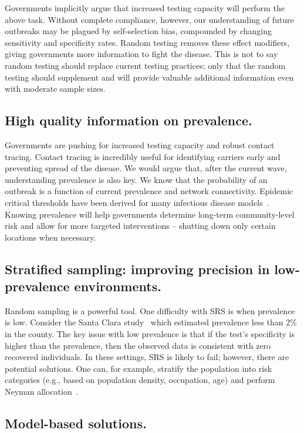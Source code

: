 \documentclass[11pt]{amsart}
\begin{document}
Governments implicitly argue that increased testing capacity will perform the above task.  Without complete compliance, however, our understanding of future outbreaks may be plagued by self-selection bias, compounded by changing sensitivity and specificity rates. Random testing removes these effect modifiers, giving governments more information to fight the disease.  This is not to say random testing should replace current testing practices; only that the random testing should supplement and will provide valuable additional information even with moderate sample sizes.

\subsection*{High quality information on prevalence.}

Governments are pushing for increased testing capacity and robust contact tracing.  Contact tracing is incredibly useful for identifying carriers early and preventing spread of the disease.  We would argue that, after the current wave, understanding prevalence is also key.  We know that the probability of an outbreak is a function of current prevalence and network connectivity.  Epidemic critical thresholds have been derived for many infectious disease models~\citep{Pastor2001,Newman2002,Parshani2010}.  Knowing prevalence will help governments determine long-term community-level risk and allow for more targeted interventions -- shutting down only certain locations when necessary.

\subsection*{Stratified sampling: improving precision in low-prevalence environments.}
Random sampling is a powerful tool.  One difficulty with SRS is when prevalence is low.  Consider the Santa Clara study~\citep{Bendavid2020} which estimated prevalence less than 2\% in the county.  The key issue with low prevalence is that if the test's specificity is higher than the prevalence, then the observed data is consistent with zero recovered individuals. In these settings, SRS is likely to fail; however, there are potential solutions.  One can, for example, stratify the population into risk categories (e.g., based on population density, occupation, age) and perform Neyman allocation~\citep{Cochran77}.

\subsection*{Model-based solutions.}
\end{document}

